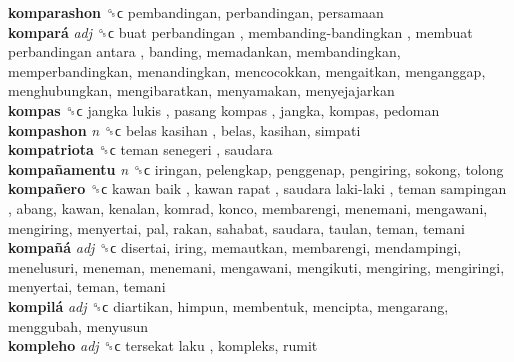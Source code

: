 \textbf{komparashon} ␝ϲ  pembandingan, perbandingan, persamaan  \\
\textbf{kompará} \emph{adj}  ␝ϲ   buat perbandingan ,  membanding-bandingkan ,  membuat perbandingan antara , banding, memadankan, membandingkan, memperbandingkan, menandingkan, mencocokkan, mengaitkan, menganggap, menghubungkan, mengibaratkan, menyamakan, menyejajarkan  \\
\textbf{kompas} ␝ϲ   jangka lukis ,  pasang kompas , jangka, kompas, pedoman  \\
\textbf{kompashon} \emph{n}  ␝ϲ   belas kasihan , belas, kasihan, simpati  \\
\textbf{kompatriota} ␝ϲ   teman senegeri , saudara  \\
\textbf{kompañamentu} \emph{n}  ␝ϲ  iringan, pelengkap, penggenap, pengiring, sokong, tolong  \\
\textbf{kompañero} ␝ϲ   kawan baik ,  kawan rapat ,  saudara laki-laki ,  teman sampingan , abang, kawan, kenalan, komrad, konco, membarengi, menemani, mengawani, mengiring, menyertai, pal, rakan, sahabat, saudara, taulan, teman, temani  \\
\textbf{kompañá} \emph{adj}  ␝ϲ  disertai, iring, memautkan, membarengi, mendampingi, menelusuri, meneman, menemani, mengawani, mengikuti, mengiring, mengiringi, menyertai, teman, temani  \\
\textbf{kompilá} \emph{adj}  ␝ϲ  diartikan, himpun, membentuk, mencipta, mengarang, menggubah, menyusun  \\
\textbf{kompleho} \emph{adj}  ␝ϲ   tersekat laku , kompleks, rumit  \\
